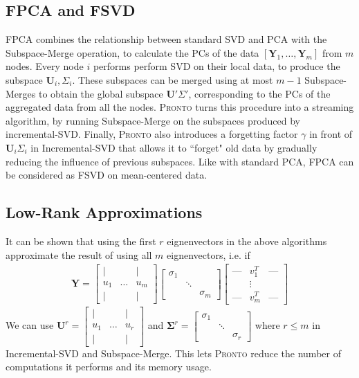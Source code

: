 \subsection{FPCA and FSVD}
FPCA combines the relationship between standard SVD and PCA with the
Subspace-Merge operation, to calculate the PCs of the data $[\mathbf{Y}_1,
\ldots,\mathbf{Y}_m]$ from $m$ nodes. Every node $i$ performs perform SVD  on
their local data, to produce the subspace $\mathbf{U}_i, \Sigma_i$. These
subspaces can be merged using at most $m-1$ Subspace-Merges to obtain the global
subspace $\mathbf{U}'\Sigma'$, corresponding to the PCs of the aggregated data
from all the nodes. \textsc{Pronto} turns this procedure into a streaming algorithm, by
running Subspace-Merge on the subspaces produced by incremental-SVD. Finally,
\textsc{Pronto} also introduces a forgetting factor $\gamma$ in front of
$\mathbf{U}_i\Sigma_i$ in Incremental-SVD that allows it to ``forget" old data
by gradually reducing the influence of previous subspaces. Like with standard
PCA, FPCA can be considered as FSVD on mean-centered data.

\subsection{Low-Rank Approximations}
It can be shown that using the first $r$ eignenvectors in the above algorithms
approximate the result of using all $m$ eignenvectors, i.e. if
\begin{align}
\mathbf{Y} = \begin{bmatrix} \mid & & \mid \\ u_1 & \ldots & u_m
    \\ \mid & & \mid  \end{bmatrix} \begin{bmatrix} \sigma_1 &
        & \\ & \ddots & \\ & & \sigma_m \end{bmatrix} \begin{bmatrix} \text{---}
& v_1^T & \text{---} \\ & \vdots & \\ \text{---} & v_m^T & \text{---}
\end{bmatrix}
\end{align}
We can use $\mathbf{U}^r = \begin{bmatrix} \mid & & \mid \\ u_1 & \ldots & u_r
    \\ \mid & & \mid  \end{bmatrix}$ and $\mathbf{\Sigma}^r = \begin{bmatrix}
\sigma_1 & & \\ & \ddots & \\ & & \sigma_r \end{bmatrix}$ where $r \leq m$ in
Incremental-SVD and Subspace-Merge. This lets \textsc{Pronto} reduce the number of
computations it performs and its memory usage.

